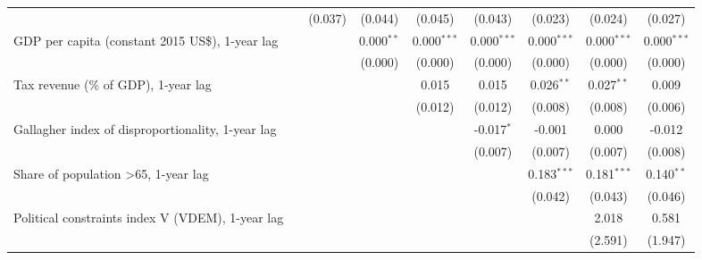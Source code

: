 \begin{table}[htbp]
\begin{tabular}{lcccccccc}
                                                                                &                & (0.037)       & (0.044)        & (0.045)        & (0.043)        & (0.023)        & (0.024)        & (0.027)\\   
      GDP per capita (constant 2015 US\$), 1-year lag                           &                &               & 0.000$^{**}$   & 0.000$^{***}$  & 0.000$^{***}$  & 0.000$^{***}$  & 0.000$^{***}$  & 0.000$^{***}$\\   
                                                                                &                &               & (0.000)        & (0.000)        & (0.000)        & (0.000)        & (0.000)        & (0.000)\\   
      Tax revenue (\% of GDP), 1-year lag                                       &                &               &                & 0.015          & 0.015          & 0.026$^{**}$   & 0.027$^{**}$   & 0.009\\   
                                                                                &                &               &                & (0.012)        & (0.012)        & (0.008)        & (0.008)        & (0.006)\\   
      Gallagher index of disproportionality, 1-year lag                         &                &               &                &                & -0.017$^{*}$   & -0.001         & 0.000          & -0.012\\   
                                                                                &                &               &                &                & (0.007)        & (0.007)        & (0.007)        & (0.008)\\   
      Share of population >65, 1-year lag                                       &                &               &                &                &                & 0.183$^{***}$  & 0.181$^{***}$  & 0.140$^{**}$\\   
                                                                                &                &               &                &                &                & (0.042)        & (0.043)        & (0.046)\\   
      Political constraints index V (VDEM), 1-year lag                          &                &               &                &                &                &                & 2.018          & 0.581\\   
                                                                                &                &               &                &                &                &                & (2.591)        & (1.947)\\   

\end{tabular}
\end{table}
